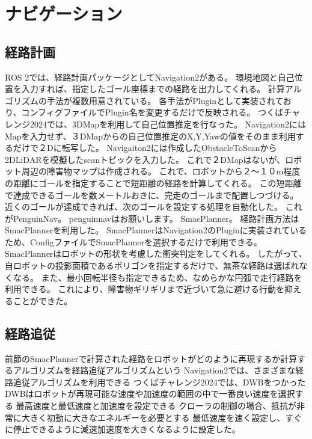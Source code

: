 \section{ナビゲーション}
\subsection{経路計画}
ROS 2では、経路計画パッケージとしてNavigation2がある。
環境地図と自己位置を入力すれば、指定したゴール座標までの経路を出力してくれる。
計算アルゴリズムの手法が複数用意されている。
各手法がPluginとして実装されており、コンフィグファイルでPlugin名を変更するだけで反映される。
つくばチャレンジ2024では、3DMapを利用して自己位置推定を行なった。
Navigation2にはMapを入力せず、３DMapからの自己位置推定のX,Y,Yawの値をそのまま利用するだけで２Dに転写した。
Navigaiton2には作成したObstacleToScanから2DLiDARを模擬したscanトピックを入力した。
これで２DMapはないが、ロボット周辺の障害物マップは作成される。
これで、ロボットから２〜１０m程度の距離にゴールを指定することで短距離の経路を計算してくれる。
この短距離で達成できるゴールを数メートルおきに、完走のゴールまで配置しつづける。
近くのゴールが達成できれば、次のゴールを設定する処理を自動化した。
これがPenguinNav。
penguinnavはお願いします。
SmacPlanner。
経路計画方法はSmacPlannerを利用した。
SmacPlannerはNavigation2のPluginに実装されているため、ConfigファイルでSmacPlannerを選択するだけで利用できる。
SmacPlannerはロボットの形状を考慮した衝突判定をしてくれる。
したがって、自ロボットの投影面積であるポリゴンを指定するだけで、無茶な経路は選ばれなくなる。
また、最小回転半径も指定できるため、なめらかな円弧で走行経路を利用できる。
これにより、障害物ギリギリまで近づいて急に避ける行動を抑えることができた。

\subsection{経路追従}
前節のSmacPlannerで計算された経路をロボットがどのように再現するか計算するアルゴリズムを経路追従アルゴリズムという
Navigation2では、さまざまな経路追従アルゴリズムを利用できる
つくばチャレンジ2024では、DWBをつかった
DWBはロボットが再現可能な速度や加速度の範囲の中で一番良い速度を選択する
最高速度と最低速度と加速度を設定できる
クローラの制御の場合、抵抗が非常に大きく初動に大きなエネルギーを必要とする
最低速度を速く設定し、すぐに停止できるように減速加速度を大きくなるように設定した。